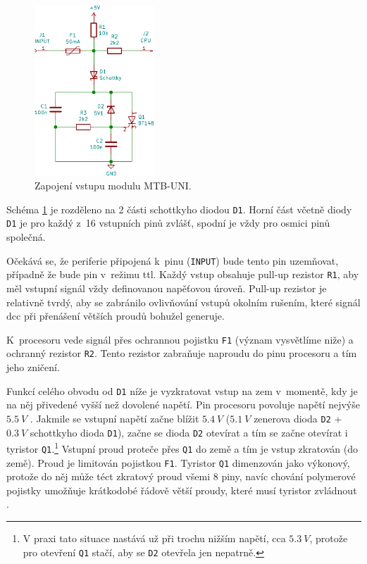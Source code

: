 \begin{figure}[ht]
\includegraphics[width=0.4\textwidth]{data/uni-input/uni-input.pdf}
\caption{Zapojení vstupu modulu MTB-UNI.}
\label{fig:mtbuni-input}
\end{figure}

Schéma \ref{fig:mtbuni-input} je rozděleno na 2 části schottkyho diodou
\texttt{D1}. Horní část včetně diody \texttt{D1} je pro každý z~16 vstupních
pinů zvlášť, spodní je vždy pro osmici pinů společná.

Očekává se, že periferie připojená k~pinu (\texttt{INPUT}) bude tento pin
uzemňovat, případně že bude pin v~režimu \gls{ttl}. Každý vstup obsahuje
pull-up rezistor \texttt{R1}, aby měl vstupní signál vždy definovanou napěťovou
úroveň. Pull-up rezistor je relativně tvrdý, aby se zabránilo ovlivňování
vstupů okolním rušením, které signál \gls{dcc} při přenášení větších proudů
bohužel generuje.

K~procesoru vede signál přes ochrannou pojistku \texttt{F1} (význam vysvětlíme
niže) a ochranný rezistor \texttt{R2}. Tento rezistor zabraňuje naproudu do pinu
procesoru a tím jeho zničení.

Funkcí celého obvodu od \texttt{D1} níže je vyzkratovat vstup na zem v~momentě,
kdy je na něj přivedené vyšší než dovolené napětí. Pin procesoru povoluje
napětí nejvýše $5.5~V$ \cite{atmega128-datasheet}. Jakmile se vstupní napětí
začne blížit $5.4~V$ ($5.1~V$ zenerova dioda \texttt{D2} + $0.3~V$ schottkyho
dioda \texttt{D1}), začne se dioda \texttt{D2} otevírat a tím se začne otevírat
i tyristor \texttt{Q1}.\footnote{V praxi tato situace nastává už při trochu
nižším napětí, cca $5.3~V$, protože pro otevření \texttt{Q1} stačí, aby se
\texttt{D2} otevřela jen nepatrně.} Vstupní proud proteče přes \texttt{Q1} do
země a tím je vstup zkratován (do země). Proud je limitován pojistkou \texttt{F1}.
Tyristor \texttt{Q1} dimenzován jako výkonový, protože do něj může téct zkratový
proud všemi 8 piny, navíc chování polymerové pojistky umožňuje krátkodobé řádově
větší proudy, které musí tyristor zvládnout \cite{polyfuse-behavior}.

